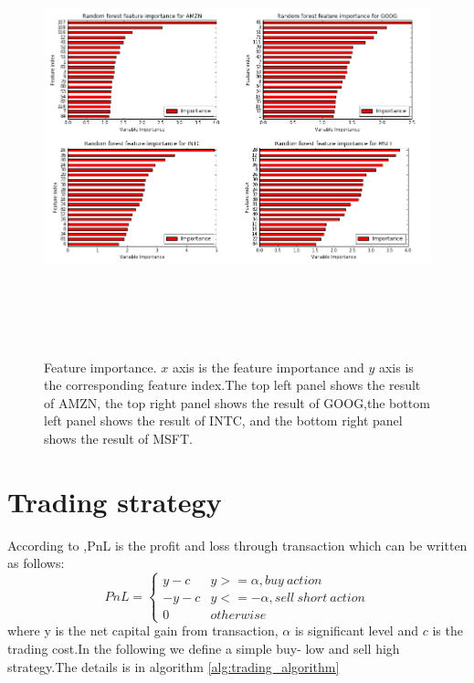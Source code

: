 \begin{figure}[hbtp]
  \begin{center}
    \includegraphics[width=6in,height=5in]{figures/feature_importance.png}
  \end{center}
\caption{Feature importance. $x$ axis is the feature importance and $y$ axis is the corresponding feature index.The top left panel shows the result of AMZN, the top right panel shows the result of GOOG,the bottom left panel shows the result of INTC, and the bottom right panel shows the result of MSFT. } \label{fig:feature_importance}
\end{figure}


\section{Trading strategy}
According to \cite{zhou2015evolution},PnL is the profit and loss through transaction which can be written as follows:\\
\begin{equation}       
PnL=\left\{          
  \begin{array}{ll}   
    y-c  & y>=\alpha, buy\ action   \\  
     -y-c & y<=-\alpha, sell\ short\ action \\
     0 & otherwise
  \end{array}
\right.       
\end{equation}
where y is the net capital gain from transaction, $\alpha$ is significant level and $c$ is the trading cost.In the following we define a simple buy- low and sell high strategy.The details is in algorithm \ref{alg:trading_algorithm}


